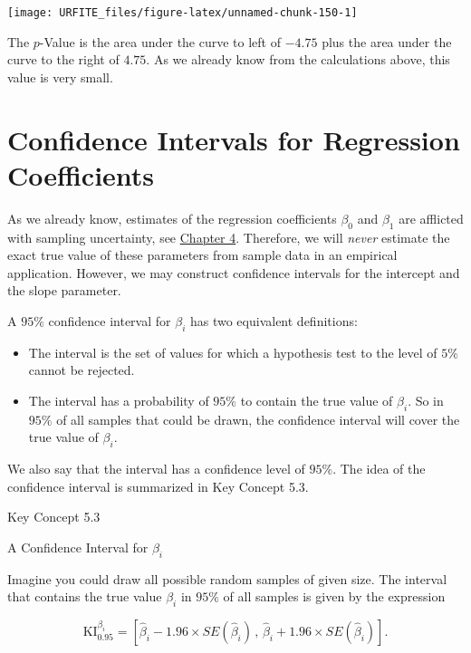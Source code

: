 \documentclass[]{book}
\providecommand{\tightlist}{%
  \setlength{\itemsep}{0pt}\setlength{\parskip}{0pt}}
\theoremstyle{definition}
\theoremstyle{definition}
\theoremstyle{definition}
\theoremstyle{remark}
\begin{document}
\begin{center}\texttt{[image: URFITE\_files/figure-latex/unnamed-chunk-150-1]} \end{center}

The \(p\)-Value is the area under the curve to left of \(-4.75\) plus
the area under the curve to the right of \(4.75\). As we already know
from the calculations above, this value is very small.

\section{Confidence Intervals for Regression
Coefficients}\label{confidence-intervals-for-regression-coefficients}

As we already know, estimates of the regression coefficients \(\beta_0\)
and \(\beta_1\) are afflicted with sampling uncertainty, see
\protect\hyperlink{lrwor}{Chapter 4}. Therefore, we will \emph{never}
estimate the exact true value of these parameters from sample data in an
empirical application. However, we may construct confidence intervals
for the intercept and the slope parameter.

A \(95\%\) confidence interval for \(\beta_i\) has two equivalent
definitions:

\begin{itemize}
\tightlist
\item
  The interval is the set of values for which a hypothesis test to the
  level of \(5\%\) cannot be rejected.
\item
  The interval has a probability of \(95\%\) to contain the true value
  of \(\beta_i\). So in \(95\%\) of all samples that could be drawn, the
  confidence interval will cover the true value of \(\beta_i\).
\end{itemize}

We also say that the interval has a confidence level of \(95\%\). The
idea of the confidence interval is summarized in Key Concept 5.3.

Key Concept 5.3

A Confidence Interval for \(\beta_i\)

Imagine you could draw all possible random samples of given size. The
interval that contains the true value \(\beta_i\) in \(95\%\) of all
samples is given by the expression

\[ \text{KI}_{0.95}^{\beta_i} = \left[ \hat{\beta}_i - 1.96 \times SE(\hat{\beta}_i) \, , \, \hat{\beta}_i + 1.96 \times SE(\hat{\beta}_i) \right]. \]
\end{document}

